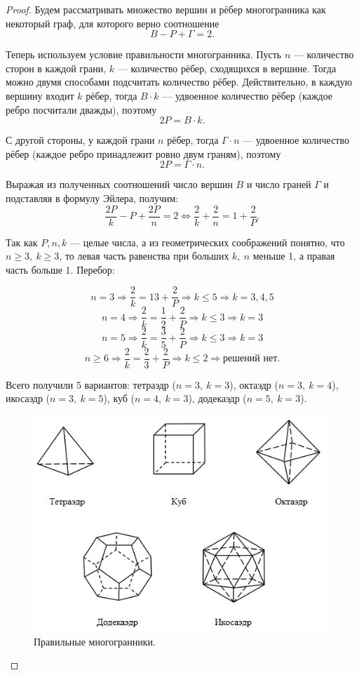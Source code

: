 \begin{proof}
    Будем рассматривать множество вершин и рёбер многогранника как некоторый граф, для которого верно соотношение \[B - P + \Gamma = 2.\]

    Теперь используем условие правильности многогранника. Пусть $n$ — количество сторон в каждой грани, $k$ — количество рёбер, сходящихся в вершине. Тогда можно двумя способами подсчитать количество рёбер. Действительно, в каждую вершину входит $k$ рёбер, тогда $B \cdot k$ — удвоенное количество рёбер (каждое ребро посчитали дважды), поэтому \[2P = B \cdot k.\]
    
    С другой стороны, у каждой грани $n$ рёбер, тогда $\Gamma \cdot n$ — удвоенное количество рёбер (каждое ребро принадлежит ровно двум граням), поэтому \[2P = \Gamma \cdot n.\]

    Выражая из полученных соотношений число вершин $B$ и число граней $\Gamma$ и подставляя в формулу Эйлера, получим:
    \[\frac{2P}{k} - P + \frac{2P}{n} = 2 \Leftrightarrow \frac{2}{k} + \frac{2}{n} = 1 + \frac{2}{P}.\]

    Так как $P,n,k$ — целые числа, а из геометрических соображений понятно, что $n \geq 3, \ k \geq 3$, то левая часть равенства при больших $k, \ n$ меньше 1, а правая часть больше 1. Перебор:

    \[n = 3 \Rightarrow \frac{2}{k} = {1}{3} + \frac{2}{P} \Rightarrow k \leq 5 \Rightarrow k = 3,4,5\]
    \[n = 4 \Rightarrow \frac{2}{k} = \frac{1}{2} + \frac{2}{P} \Rightarrow k \leq 3 \Rightarrow k = 3\]
    \[n = 5 \Rightarrow \frac{2}{k} = \frac{3}{5} + \frac{2}{P} \Rightarrow k \leq 3 \Rightarrow k = 3\]
    \[n \geq 6 \Rightarrow \frac{2}{k} = \frac{2}{3} + \frac{2}{P} \Rightarrow k \leq 2 \Rightarrow \text{решений нет}.\]

    Всего получили 5 вариантов: тетраэдр ($n = 3, \ k = 3$), октаэдр ($n = 3, \ k = 4$), икосаэдр ($n = 3, \ k = 5$), куб ($n = 4, \ k = 3$), додекаэдр ($n = 5, \ k = 3$).

    \begin{figure}[h]
        \centering
        \includegraphics[scale=0.8]{images/c7.5.png}
        \caption{Правильные многогранники.}
        \label{fig:c7.5}
    \end{figure}




\end{proof}
